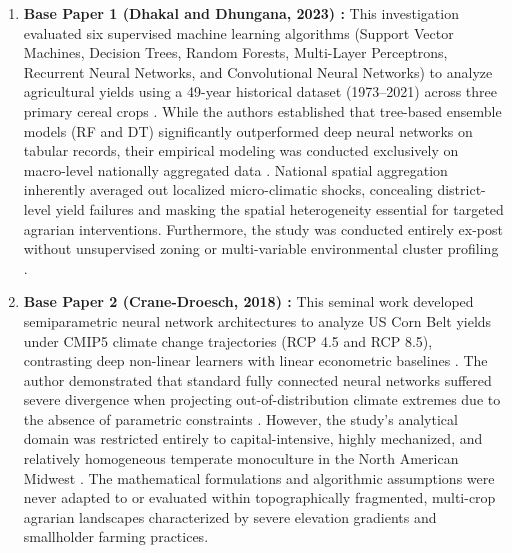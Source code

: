 \documentclass[conference]{IEEEtran}
\begin{document}
\begin{enumerate}
    \item \textbf{Base Paper 1 (Dhakal and Dhungana, 2023) \cite{dhakal2023}:} This investigation evaluated six supervised machine learning algorithms (Support Vector Machines, Decision Trees, Random Forests, Multi-Layer Perceptrons, Recurrent Neural Networks, and Convolutional Neural Networks) to analyze agricultural yields using a 49-year historical dataset (1973--2021) across three primary cereal crops \cite{dhakal2023}. While the authors established that tree-based ensemble models (RF and DT) significantly outperformed deep neural networks on tabular records, their empirical modeling was conducted exclusively on macro-level nationally aggregated data \cite{dhakal2023}. National spatial aggregation inherently averaged out localized micro-climatic shocks, concealing district-level yield failures and masking the spatial heterogeneity essential for targeted agrarian interventions. Furthermore, the study was conducted entirely ex-post without unsupervised zoning or multi-variable environmental cluster profiling \cite{macqueen1967, rousseeuw1987, davies1979}.
    
    \item \textbf{Base Paper 2 (Crane-Droesch, 2018) \cite{crane2018}:} This seminal work developed semiparametric neural network architectures to analyze US Corn Belt yields under CMIP5 climate change trajectories (RCP 4.5 and RCP 8.5), contrasting deep non-linear learners with linear econometric baselines \cite{crane2018}. The author demonstrated that standard fully connected neural networks suffered severe divergence when projecting out-of-distribution climate extremes due to the absence of parametric constraints \cite{crane2018, lobell2008, schlenker2009}. However, the study's analytical domain was restricted entirely to capital-intensive, highly mechanized, and relatively homogeneous temperate monoculture in the North American Midwest \cite{crane2018}. The mathematical formulations and algorithmic assumptions were never adapted to or evaluated within topographically fragmented, multi-crop agrarian landscapes characterized by severe elevation gradients and smallholder farming practices.
    

\end{enumerate}
\end{document}
